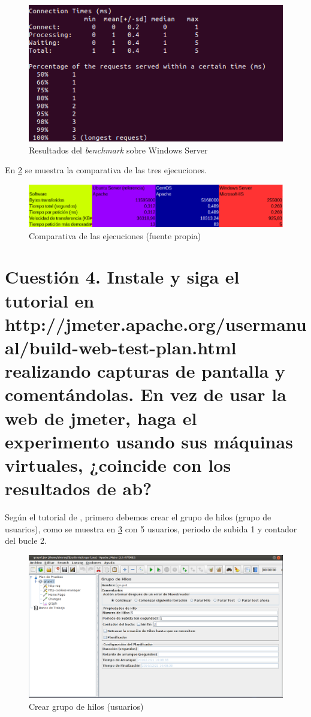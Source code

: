 \begin{figure}[H]
	\centering
	\includegraphics[scale=0.6]{cuestion3-06.png}
	\caption{Resultados del \textit{benchmark} sobre Windows Server} \label{cuestion3-06}
\end{figure}

En \ref{cuestion3-07} se muestra la comparativa de las tres ejecuciones.

\begin{figure}[H]
	\centering
	\includegraphics[scale=0.45]{cuestion3-07.png}
	\caption{Comparativa de las ejecuciones (fuente propia)} \label{cuestion3-07}
\end{figure}

\section{Cuestión 4. Instale y siga el tutorial en http://jmeter.apache.org/usermanual/build-web-test-plan.html realizando capturas de pantalla y comentándolas. En vez de usar la web de jmeter, haga el experimento usando sus máquinas virtuales, ¿coincide con los resultados de ab?}

Según el tutorial de \cite{jmeter}, primero debemos crear el grupo de hilos (grupo de usuarios), como se muestra en \ref{cuestion4-01} con 5 usuarios, periodo de subida 1 y contador del bucle 2.

\begin{figure}[H]
	\centering
	\includegraphics[scale=0.4]{cuestion4-01.png}
	\caption{Crear grupo de hilos (usuarios)} \label{cuestion4-01}
\end{figure}

